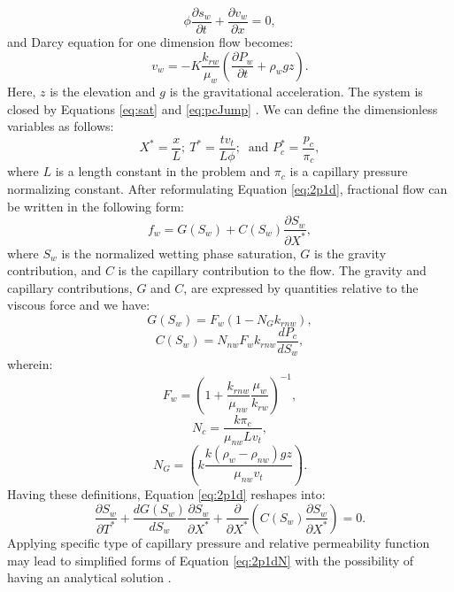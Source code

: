  \begin{equation}
  \phi \frac{\partial s_{w}}{\partial t}+ \frac {\partial v_w} {\partial x}=0,
  \label{eq:2p1d}
 \end{equation} and Darcy equation for one
dimension
flow becomes:
 \begin{equation}
  v_w=-K\frac{k_{rw}}{\mu_w}(\frac{\partial P_w}{\partial t} + \rho_w g z).
  \label{eq:D1d}
 \end{equation} Here, $z$ is the elevation and $g$ is the gravitational
acceleration. The system is closed by Equations \ref{eq:sat} and \ref{eq:pcJump}
. We can define the dimensionless variables as follows:
 \begin{equation}
  X^*=\frac{x}{L};~T^*=\frac{tv_t}{L\phi};~\mbox{ and }P^*_c=\frac{p_c}{\pi_c},
  \label{eq:var*}
 \end{equation} where $L$ is a length constant in the problem and $\pi_c$ is a
capillary pressure normalizing constant. After reformulating Equation
\ref{eq:2p1d}, fractional flow can be written in the following form:
 \begin{equation}
  f_w=G(S_w)+C(S_w)\frac{\partial S_w}{\partial X^*},
 \end{equation} where $S_w$ is the normalized wetting phase saturation, $G$ is
the gravity contribution, and $C$ is the capillary contribution to
the flow. The gravity and capillary contributions, $G$ and $C$, are expressed
by quantities relative to the viscous force \cite{hadley1956theoretical} and we
have:
 \begin{equation}
  G(S_w)=F_w(1-N_Gk_{rnw}),
  \label{eq:GrCont}
 \end{equation}
 \begin{equation}
  C(S_w)=N_{nw}F_wk_{rnw}\frac{dP_{c}}{dS_w},
  \label{eq:PcCont}
 \end{equation} wherein: 
 \begin{equation}
  F_w=(1+\frac{k_{rnw}}{\mu_{nw}}\frac{\mu_w}{k_{rw}})^{-1},
  \label{eq:Fn}
 \end{equation}
 \begin{equation}
  N_c=\frac{k\pi_c}{\mu_{nw}Lv_t},
  \label{eq:Nc}
 \end{equation}
 \begin{equation}
  N_G=(k\frac{k(\rho_w-\rho_{nw})gz}{\mu_{nw}v_t}).
  \label{eq:Fn}
 \end{equation} Having these definitions, Equation \ref{eq:2p1d} reshapes into:
 \begin{equation}
  \frac{\partial S_w}{\partial T^*}+\frac{dG(S_w)}{dS_w}\frac{\partial
S_w}{\partial X^*}+\frac{\partial}{\partial X^*}\left( C(S_w)\frac{\partial
S_w}{\partial X^*}\right)=0.
  \label{eq:2p1dN}
 \end{equation} Applying specific type of capillary pressure and relative
permeability function may lead to simplified forms of Equation \ref{eq:2p1dN}
with the possibility of having an analytical
solution \cite{yortsos1983analytical}. 


